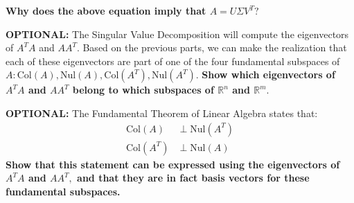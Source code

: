 \begin{enumerate}[resume]
  \qitem \textbf{Why does the above equation imply that $A = U \Sigma V^{T}?$}

  \ws{\vspace{50px}}


  \newpage

  \qitem \textbf{OPTIONAL:} The Singular Value Decomposition will compute the eigenvectors of $A^{T} A$ and $AA^{T}.$ 
  Based on the previous parts, we can make the realization that each of these eigenvectors are part of one of the four fundamental subspaces of $A: \text{Col}(A), \text{Nul}(A), \text{Col}(A^{T}), \text{Nul}(A^{T}).$
  \textbf{Show which eigenvectors of $A^{T} A$ and $AA^{T}$ belong to which subspaces of $\mathbb{R}^{n}$ and $\mathbb{R}^{m}.$}

  \ws{\vspace{100px}}


  \qitem \textbf{OPTIONAL:} The Fundamental Theorem of Linear Algebra states that:
  \begin{align*}
    \text{Col}(A) &\perp \text{Nul}(A^{T}) \\
    \text{Col}(A^{T}) &\perp \text{Nul}(A)
  \end{align*}  
  \textbf{Show that this statement can be expressed using the eigenvectors of $A^{T}A$ and $AA^{T},$ and that they are in fact basis vectors for these fundamental subspaces.}


\end{enumerate}

